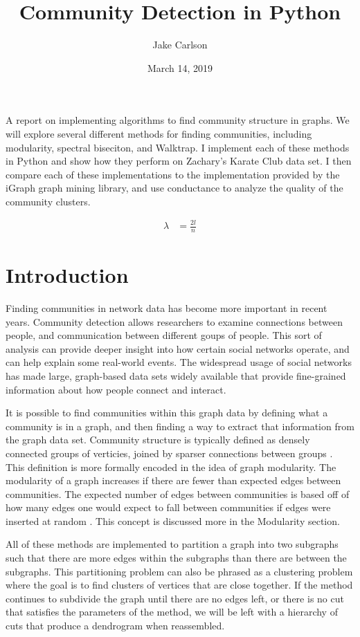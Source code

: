 \documentclass{article}
\begin{document}
\title{Community Detection in Python}
\author{Jake Carlson}
\date{March 14, 2019}
\maketitle

\abstract
A report on implementing algorithms to find community structure in graphs. We will explore several different methods for finding communities, including modularity, spectral biseciton, and Walktrap. I implement each of these methods in Python and show how they perform on Zachary's Karate Club data set. I then compare each of these implementations to the implementation provided by the iGraph graph mining library, and use conductance to analyze the quality of the community clusters.

\begin{align}
    \lambda &= \frac{2l}{n}
\end{align}

\newpage

\tableofcontents
\newpage

\section{Introduction}
Finding communities in network data has become more important in recent years. Community detection allows researchers to examine connections between people, and communication between different goups of people. This sort of analysis can provide deeper insight into how certain social networks operate, and can help explain some real-world events. The widespread usage of social networks has made large, graph-based data sets widely available that provide fine-grained information about how people connect and interact.
\par
It is possible to find communities within this graph data by defining what a community is in a graph, and then finding a way to extract that information from the graph data set. Community structure is typically defined as densely connected groups of verticies, joined by sparser connections between groups \cite{Newman2004}. This definition is more formally encoded in the idea of graph modularity. The modularity of a graph increases if there are fewer than expected edges between communities. The expected number of edges between communities is based off of how many edges one would expect to fall between communities if edges were inserted at random \cite{Newman2006}. This concept is discussed more in the Modularity section.
\par
All of these methods are implemented to partition a graph into two subgraphs such that there are more edges within the subgraphs than there are between the subgraphs. This partitioning problem can also be phrased as a clustering problem where the goal is to find clusters of vertices that are close together. If the method continues to subdivide the graph until there are no edges left, or there is no cut that satisfies the parameters of the method, we will be left with a hierarchy of cuts that produce a dendrogram when reassembled.
\end{document}
